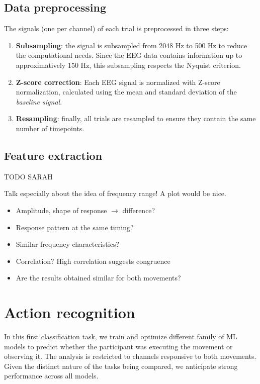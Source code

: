 \documentclass[10pt,conference,compsocconf]{IEEEtran}
\begin{document}
\subsection{Data preprocessing}
\label{subsec:preproc}
The signals (one per channel) of each trial is preprocessed in three steps:
\begin{enumerate}
  \item \textbf{Subsampling}: the signal is subsampled from 2048 Hz to 500 Hz to reduce the computational needs. Since the EEG data contains information up to approximatively 150 Hz, this subsampling respects the Nyquist criterion.
  \item \textbf{Z-score correction}: Each EEG signal is normalized with Z-score normalization, calculated using the mean and standard deviation of the \textit{baseline signal}.
  \item \textbf{Resampling}: finally, all trials are resampled to ensure they contain the same number of timepoints.
\end{enumerate}

\subsection{Feature extraction}
TODO SARAH

Talk especially about the idea of frequency range! A plot would be nice.

\begin{itemize}
    \item Amplitude, shape of response \(\to\) difference?
    \item Response pattern at the same timing?
    \item Similar frequency characteristics?
    \item Correlation? High correlation suggests congruence
    \item Are the results obtained similar for both movements?
\end{itemize}

\section{Action recognition}
\label{sec:actionrecognition}
In this first classification task, we train and optimize different family of ML models to predict whether the participant was executing the movement or observing it. The analysis is restricted to channels responsive to both movements. Given the distinct nature of the tasks being compared, we anticipate strong performance across all models.
\end{document}
